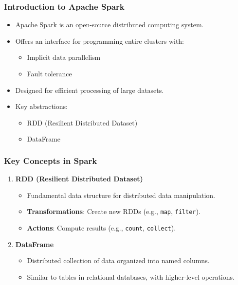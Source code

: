 \documentclass[aspectratio=169]{beamer}
\begin{document}
\begin{frame}
    \frametitle{Introduction to Apache Spark}
    \begin{itemize}
        \item Apache Spark is an open-source distributed computing system.
        \item Offers an interface for programming entire clusters with:
        \begin{itemize}
            \item Implicit data parallelism
            \item Fault tolerance
        \end{itemize}
        \item Designed for efficient processing of large datasets.
        \item Key abstractions:
        \begin{itemize}
            \item RDD (Resilient Distributed Dataset)
            \item DataFrame
        \end{itemize}
    \end{itemize}
\end{frame}

\begin{frame}[fragile]
    \frametitle{Key Concepts in Spark}
    \begin{enumerate}
        \item \textbf{RDD (Resilient Distributed Dataset)}
        \begin{itemize}
            \item Fundamental data structure for distributed data manipulation.
            \item \textbf{Transformations}: Create new RDDs (e.g., \texttt{map}, \texttt{filter}).
            \item \textbf{Actions}: Compute results (e.g., \texttt{count}, \texttt{collect}).
        \end{itemize}
        
        \item \textbf{DataFrame}
        \begin{itemize}
            \item Distributed collection of data organized into named columns.
            \item Similar to tables in relational databases, with higher-level operations.
        \end{itemize}
    \end{enumerate}
\end{frame}
\end{document}
